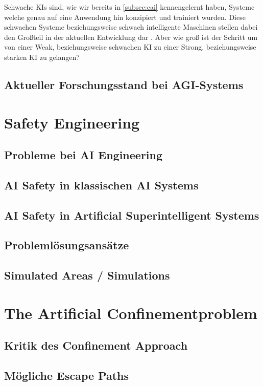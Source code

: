     Schwache KIs sind, wie wir bereits in \ref{subsec:cai} kennengelernt haben, Systeme welche genau auf
    eine Anwendung hin konzipiert und trainiert wurden. Diese schwachen Systeme beziehungsweise schwach
    intelligente Maschinen stellen dabei den Großteil in der aktuellen Entwicklung dar .
    Aber wie groß ist der Schritt um von einer Weak, beziehungsweise schwachen KI zu einer Strong,
    beziehungsweise starken KI zu gelangen?


    \subsection{Aktueller Forschungsstand bei AGI-Systems}
    
\section{Safety Engineering}
    \subsection{Probleme bei AI Engineering}
    \subsection{AI Safety in klassischen AI Systems}
    \subsection{AI Safety in Artificial Superintelligent Systems}

    \subsection{Problemlösungsansätze} 
    \subsection{Simulated Areas / Simulations}
\section{The Artificial Confinementproblem}
    \subsection{Kritik des Confinement Approach}
    \subsection{Mögliche Escape Paths}
